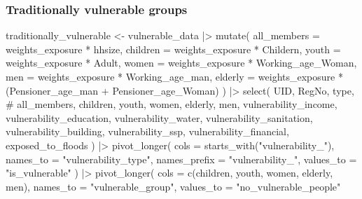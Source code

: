 \documentclass[
  letterpaper,
  DIV=11,
  numbers=noendperiod]{scrartcl}
\newenvironment{Shaded}{}{}
\newcommand{\AttributeTok}[1]{\textcolor[rgb]{0.84,0.23,0.29}{#1}}
\newcommand{\CommentTok}[1]{\textcolor[rgb]{0.42,0.45,0.49}{#1}}
\newcommand{\FunctionTok}[1]{\textcolor[rgb]{0.44,0.26,0.76}{#1}}
\newcommand{\NormalTok}[1]{\textcolor[rgb]{0.14,0.16,0.18}{#1}}
\newcommand{\OtherTok}[1]{\textcolor[rgb]{0.44,0.26,0.76}{#1}}
\newcommand{\SpecialCharTok}[1]{\textcolor[rgb]{0.00,0.36,0.77}{#1}}
\newcommand{\StringTok}[1]{\textcolor[rgb]{0.01,0.18,0.38}{#1}}
\begin{document}
\subsubsection{Traditionally vulnerable
groups}\label{traditionally-vulnerable-groups}

\begin{Shaded}
\begin{Highlighting}[]
\NormalTok{traditionally\_vulnerable }\OtherTok{\textless{}{-}}\NormalTok{ vulnerable\_data }\SpecialCharTok{|\textgreater{}}
  \FunctionTok{mutate}\NormalTok{(}
    \AttributeTok{all\_members =}\NormalTok{ weights\_exposure }\SpecialCharTok{*}\NormalTok{ hhsize,}
    \AttributeTok{children =}\NormalTok{ weights\_exposure }\SpecialCharTok{*}\NormalTok{ Childern,}
    \AttributeTok{youth =}\NormalTok{ weights\_exposure }\SpecialCharTok{*}\NormalTok{ Adult,}
    \AttributeTok{women =}\NormalTok{ weights\_exposure }\SpecialCharTok{*}\NormalTok{ Working\_age\_Woman,}
    \AttributeTok{men =}\NormalTok{ weights\_exposure }\SpecialCharTok{*}\NormalTok{ Working\_age\_man,}
    \AttributeTok{elderly =}\NormalTok{ weights\_exposure }\SpecialCharTok{*}
\NormalTok{      (Pensioner\_age\_man }\SpecialCharTok{+}\NormalTok{ Pensioner\_age\_Woman)}
\NormalTok{  ) }\SpecialCharTok{|\textgreater{}}
  \FunctionTok{select}\NormalTok{(}
\NormalTok{    UID,}
\NormalTok{    RegNo,}
\NormalTok{    type,}
    \CommentTok{\# all\_members,}
\NormalTok{    children,}
\NormalTok{    youth,}
\NormalTok{    women,}
\NormalTok{    elderly,}
\NormalTok{    men,}
\NormalTok{    vulnerability\_income,}
\NormalTok{    vulnerability\_education,}
\NormalTok{    vulnerability\_water,}
\NormalTok{    vulnerability\_sanitation,}
\NormalTok{    vulnerability\_building,}
\NormalTok{    vulnerability\_ssp,}
\NormalTok{    vulnerability\_financial,}
\NormalTok{    exposed\_to\_floods}
\NormalTok{  ) }\SpecialCharTok{|\textgreater{}}
  \FunctionTok{pivot\_longer}\NormalTok{(}
    \AttributeTok{cols =} \FunctionTok{starts\_with}\NormalTok{(}\StringTok{"vulnerability\_"}\NormalTok{),}
    \AttributeTok{names\_to =} \StringTok{"vulnerability\_type"}\NormalTok{,}
    \AttributeTok{names\_prefix =} \StringTok{"vulnerability\_"}\NormalTok{,}
    \AttributeTok{values\_to =} \StringTok{"is\_vulnerable"}
\NormalTok{  ) }\SpecialCharTok{|\textgreater{}}
  \FunctionTok{pivot\_longer}\NormalTok{(}
    \AttributeTok{cols =} \FunctionTok{c}\NormalTok{(children, youth, women, elderly, men),}
    \AttributeTok{names\_to =} \StringTok{"vulnerable\_group"}\NormalTok{,}
    \AttributeTok{values\_to =} \StringTok{"no\_vulnerable\_people"}

\end{Highlighting}
\end{Shaded}
\end{document}
